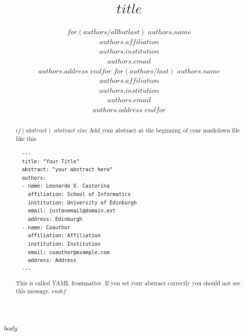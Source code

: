\documentclass{article} %
\title{$title$}
\author{%
$for(authors/allbutlast)$
  $authors.name$\\$authors.affiliation$\\$authors.institution$\\$authors.email$\\$authors.address$ \And
$endfor$
$for(authors/last)$
  $authors.name$\\$authors.affiliation$\\$authors.institution$\\$authors.email$\\$authors.address$
$endfor$
}
\makeatletter
\renewcommand{\_}{\iclr@origunderscore\allowbreak}
\makeatother
\begin{document}
\maketitle


\begin{abstract}
  $if(abstract)$
  $abstract$
  $else$
  Add your abstract at the beginning of your markdown file like this
  \begin{verbatim}
  ---
  title: "Your Title"
  abstract: "your abstract here"
  authors:
  - name: Leonardo V. Castorina
    affiliation: School of Informatics
    institution: University of Edinburgh
    email: justanemail@domain.ext
    address: Edinburgh
  - name: Coauthor
    affiliation: Affiliation
    institution: Institution
    email: coauthor@example.com
    address: Address
  ---
  \end{verbatim}
  This is called YAML frontmatter. If you set your abstract correctly you should not see this message.
  $endif$
\end{abstract}


$body$

\end{document}
